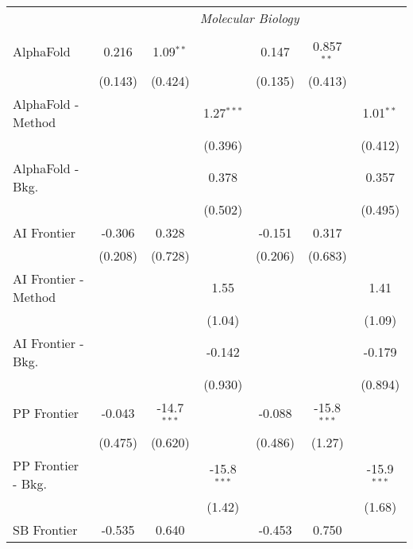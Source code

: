 \begin{tabular}{lcccccc}
 & \multicolumn{6}{c}{\textit{Molecular Biology}} \\ \\
   AlphaFold            & 0.216   & 1.09$^{**}$   &               & 0.147   & 0.857$^{**}$  &   \\   
                        & (0.143) & (0.424)       &               & (0.135) & (0.413)       &   \\   
   AlphaFold - Method   &         &               & 1.27$^{***}$  &         &               & 1.01$^{**}$\\   
                        &         &               & (0.396)       &         &               & (0.412)\\   
   AlphaFold - Bkg.     &         &               & 0.378         &         &               & 0.357\\   
                        &         &               & (0.502)       &         &               & (0.495)\\   
   AI Frontier          & -0.306  & 0.328         &               & -0.151  & 0.317         &   \\   
                        & (0.208) & (0.728)       &               & (0.206) & (0.683)       &   \\   
   AI Frontier - Method &         &               & 1.55          &         &               & 1.41\\   
                        &         &               & (1.04)        &         &               & (1.09)\\   
   AI Frontier - Bkg.   &         &               & -0.142        &         &               & -0.179\\   
                        &         &               & (0.930)       &         &               & (0.894)\\   
   PP Frontier          & -0.043  & -14.7$^{***}$ &               & -0.088  & -15.8$^{***}$ &   \\   
                        & (0.475) & (0.620)       &               & (0.486) & (1.27)        &   \\   
   PP Frontier - Bkg.   &         &               & -15.8$^{***}$ &         &               & -15.9$^{***}$\\   
                        &         &               & (1.42)        &         &               & (1.68)\\   
   SB Frontier          & -0.535  & 0.640         &               & -0.453  & 0.750         &   \\   

\end{tabular}
